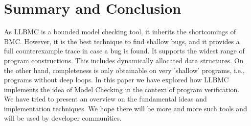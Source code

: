 \documentclass[14pt]{article}
\begin{document}
{\section{Summary and Conclusion}\label{summary and conclusion}
As LLBMC is a bounded model checking tool, it inherits the shortcomings of BMC. However, it is the best technique to find shallow bugs, and it provides a full counterexample trace in case a bug is found. It supports the widest range of program constructions. This includes dynamically allocated data structures.
On the other hand, completeness is only obtainable on very 'shallow' programs, i.e., programs
without deep loops. 
In this paper we have explored how LLBMC implements the idea of Model Checking in the context of program verification. We have tried to present an overview on the fundamental ideas and implementation techniques. We hope there will be more and more such tools and will be used by developer communities. 

 }
\end{document}
